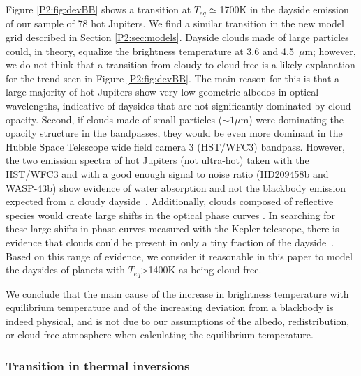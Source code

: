 Figure \ref{P2:fig:devBB} shows a transition at $T_{eq}\simeq$1700K in the dayside emission of our sample of 78 hot Jupiters. We find a similar transition in the new model grid described in Section \ref{P2:sec:models}. Dayside clouds made of large particles could, in theory, equalize the brightness temperature at 3.6 and 4.5~$\mu$m; however, we do not think that a transition from cloudy to cloud-free  is a likely explanation for the trend seen in Figure \ref{P2:fig:devBB}. The main reason for this is that a large majority of hot Jupiters show very low geometric albedos in optical wavelengths, indicative of daysides that are not significantly dominated by cloud opacity. Second, if clouds made of small particles ($\sim1\mu$m) were dominating the opacity structure in the \spitzer bandpasses, they would be even more dominant in the Hubble Space Telescope wide field camera 3 (HST/WFC3) bandpass. However, the two emission spectra of hot Jupiters (not ultra-hot) taken with the HST/WFC3 and with a good enough signal to noise ratio (HD209458b and WASP-43b) show evidence of water absorption and not the blackbody emission  expected from a cloudy dayside~\citep{Line2016a, Stevenson2014b}. Additionally, clouds composed of reflective species would create large shifts in the optical phase curves \citet{Shporer2015}. In searching for these large shifts in phase curves measured with the Kepler telescope, there is evidence that clouds could be present in only a tiny fraction of the dayside~\citep{Parmentier2016}. Based on this range of evidence, we consider it reasonable in this paper to model the daysides of planets with $T_{eq}$>1400K as being
cloud-free.%

We conclude that the main cause of the increase in brightness temperature with equilibrium temperature and of the increasing deviation from a blackbody is indeed physical, and is not due to our assumptions of the albedo, redistribution, or cloud-free atmosphere when calculating the equilibrium temperature.

\subsubsection{Transition in thermal inversions}

